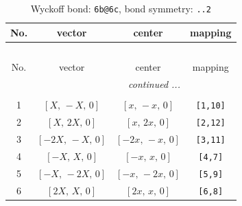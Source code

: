 \documentclass[fleqn,8pt]{jsarticle}
\begin{document}
\begin{longtable}{cccc}
\caption{Wyckoff bond: {\tt 6b@6c}, bond symmetry: {\tt ..2}}
 \\
 \hline \hline
No. & vector & center & mapping \\ \hline \endfirsthead

\multicolumn{3}{l}{\tablename\ \thetable{}} \\
 \hline \hline
No. & vector & center & mapping \\ \hline \endhead

 \hline \hline
\multicolumn{3}{r}{\footnotesize\it continued ...} \\ \endfoot

 \hline \hline
\multicolumn{3}{r}{} \\ \endlastfoot

1 & $\left[ X,\, - X,\, 0 \right]$ & $\left[ x,\, - x,\, 0 \right]$ & {\tt [1,10]} \\ \hline
2 & $\left[ X,\, 2 X,\, 0 \right]$ & $\left[ x,\, 2 x,\, 0 \right]$ & {\tt [2,12]} \\ \hline
3 & $\left[ - 2 X,\, - X,\, 0 \right]$ & $\left[ - 2 x,\, - x,\, 0 \right]$ & {\tt [3,11]} \\ \hline
4 & $\left[ - X,\, X,\, 0 \right]$ & $\left[ - x,\, x,\, 0 \right]$ & {\tt [4,7]} \\ \hline
5 & $\left[ - X,\, - 2 X,\, 0 \right]$ & $\left[ - x,\, - 2 x,\, 0 \right]$ & {\tt [5,9]} \\ \hline
6 & $\left[ 2 X,\, X,\, 0 \right]$ & $\left[ 2 x,\, x,\, 0 \right]$ & {\tt [6,8]} \\
\end{longtable}
\renewcommand{\arraystretch}{1.2}
\end{document}
